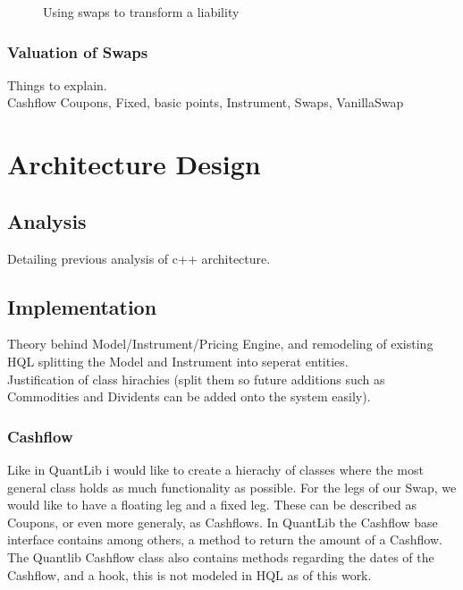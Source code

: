\documentclass{article}
\theoremstyle{definition}
\begin{document}
\begin{figure}[h]
    \centering
    \caption{Using swaps to transform a liability}
    \label{fig:swapTrans}
\end{figure}

\subsubsection{Valuation of Swaps}

Things to explain.\\
Cashflow Coupons, Fixed, basic points, Instrument, Swaps, VanillaSwap\\



\section{Architecture Design}
\subsection{Analysis}
Detailing previous analysis of c++ architecture.\\

\subsection{Implementation}
Theory behind Model/Instrument/Pricing Engine, and remodeling of existing HQL splitting
the Model and Instrument into seperat entities.\\
Justification of class hirachies (split them so future additions such as Commodities and Dividents
can be added onto the system easily).


\subsubsection{Cashflow}
Like in QuantLib i would like to create a hierachy of classes where the 
most general class holds as much functionality as possible. For the legs
of our Swap, we would like to have a floating leg and a fixed leg. These
can be described as Coupons, or even more generaly, as Cashflows. 
In QuantLib the Cashflow base interface contains among others, a method
to return the amount of a Cashflow. The Quantlib Cashflow class also contains
methods regarding the dates of the Cashflow, and a hook, this is not modeled
in HQL as of this work. 
\end{document}
